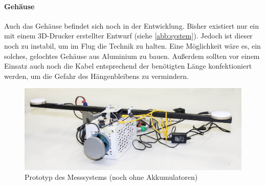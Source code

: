 \documentclass[a4paper,12pt,bibliography=totoc, listof=totoc,titlepage,pointlessnumbers]{scrreprt}
\begin{document}
\paragraph{Gehäuse}
Auch das Gehäuse befindet sich noch in der Entwicklung. Bisher existiert nur ein mit einem 3D-Drucker erstellter Entwurf (siehe \autoref{abb:system}). Jedoch ist dieser noch zu instabil, um im Flug die Technik zu halten. Eine Mög\-lich\-keit wäre es, ein solches, gelochtes Gehäuse aus Aluminium zu bauen. Außerdem sollten vor einem Einsatz auch noch die Kabel entsprechend der benötigten Länge konfektioniert werden, um die Gefahr des Hängenbleibens zu vermindern.

\begin{figure}
 \centering
 \includegraphics[width=1\textwidth]{img/system.jpg}
 \caption{Prototyp des Messsystems (noch ohne Akkumulatoren)}
 \label{abb:system}
\end{figure}


\renewcommand\UrlFont\itshape

\listoffigures
\end{document}
